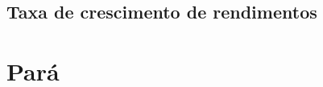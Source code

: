 \documentclass[10pt]{beamer}
\begin{document}
\begin{frame}
\textit{\hyperlink{indice_principal_amz_mt}{}}

\end{frame}


\begin{frame}
\textit{\hyperlink{indice_principal_amz_mt}{}}

\end{frame}


\begin{frame}
\textit{\hyperlink{indice_principal_amz_mt}{}}

\end{frame}

\subsection{Taxa de crescimento de rendimentos}

\begin{frame}
\textit{\hyperlink{indice_principal_amz_mt}{}}

\end{frame}


\begin{frame}
\textit{\hyperlink{indice_principal_amz_mt}{}}

\end{frame}


\begin{frame}
\textit{\hyperlink{indice_principal_amz_mt}{}}

\end{frame}


\section{Pará}
\end{document}
